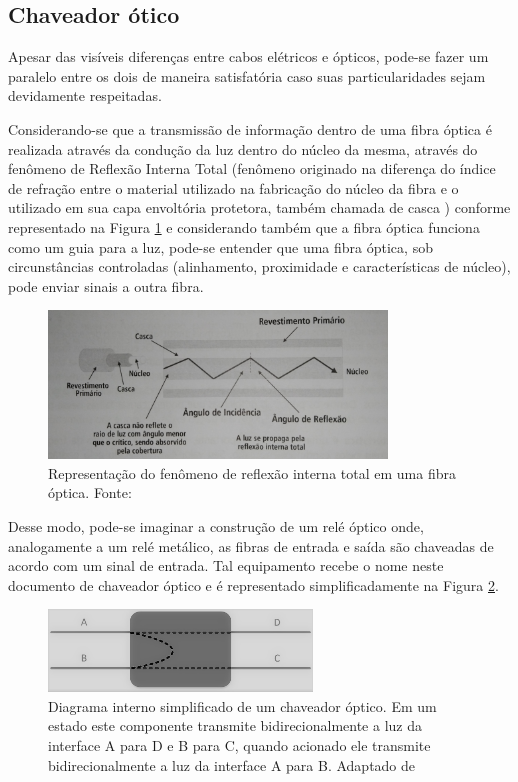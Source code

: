 \documentclass[12pt]{article}
\begin{document}
\subsection{Chaveador ótico}
Apesar das visíveis diferenças entre cabos elétricos e ópticos, pode-se fazer um paralelo entre os dois de maneira satisfatória caso suas particularidades sejam devidamente respeitadas. 

Considerando-se que a transmissão de informação dentro de uma fibra óptica é realizada através da condução da luz dentro do núcleo da mesma, através do fenômeno de Reflexão Interna Total (fenômeno originado na diferença do índice de refração entre o material utilizado
na fabricação do núcleo da fibra e o utilizado em sua capa envoltória protetora, também chamada de casca \cite{inbook_data_cabling}) conforme representado na Figura \ref{fig_fibra_optica} e considerando  também que a fibra óptica funciona como um guia para a luz, pode-se entender que uma fibra óptica, sob circunstâncias controladas (alinhamento, proximidade e características de núcleo), pode enviar sinais a outra fibra. 

\begin{figure} %
	\centering
	\includegraphics[width=9cm]{fibra_optica}
	\caption{Representação do fenômeno de reflexão interna total em uma fibra óptica. Fonte: \cite{inbook_data_cabling}}
	\label{fig_fibra_optica}
\end{figure}

Desse modo, pode-se imaginar a construção de um relé óptico onde, analogamente a um relé metálico, as fibras de entrada e saída são chaveadas de acordo com um sinal de entrada. Tal equipamento recebe o nome neste documento de chaveador óptico e é representado simplificadamente na Figura \ref{fig_switch_optico}. 

\begin{figure} %
	\centering
	\includegraphics[width=7cm]{Switch_optico}
	\caption{Diagrama interno simplificado de um chaveador óptico. Em um estado este componente transmite bidirecionalmente a luz da interface A para D e B para C, quando acionado ele transmite bidirecionalmente a luz da interface A para B. Adaptado de \cite{Accelink2014}}
	\label{fig_switch_optico}
\end{figure}
\end{document}
